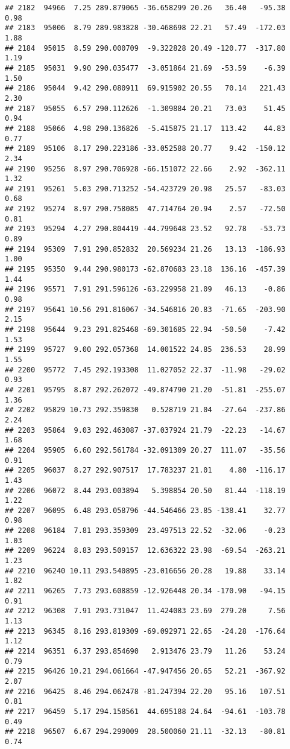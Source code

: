 \documentclass[]{article}
\begin{document}
\begin{verbatim}
## 2182  94966  7.25 289.879065 -36.658299 20.26   36.40   -95.38  0.98
## 2183  95006  8.79 289.983828 -30.468698 22.21   57.49  -172.03  1.88
## 2184  95015  8.59 290.000709  -9.322828 20.49 -120.77  -317.80  1.19
## 2185  95031  9.90 290.035477  -3.051864 21.69  -53.59    -6.39  1.50
## 2186  95044  9.42 290.080911  69.915902 20.55   70.14   221.43  2.30
## 2187  95055  6.57 290.112626  -1.309884 20.21   73.03    51.45  0.94
## 2188  95066  4.98 290.136826  -5.415875 21.17  113.42    44.83  0.77
## 2189  95106  8.17 290.223186 -33.052588 20.77    9.42  -150.12  2.34
## 2190  95256  8.97 290.706928 -66.151072 22.66    2.92  -362.11  1.32
## 2191  95261  5.03 290.713252 -54.423729 20.98   25.57   -83.03  0.68
## 2192  95274  8.97 290.758085  47.714764 20.94    2.57   -72.50  0.81
## 2193  95294  4.27 290.804419 -44.799648 23.52   92.78   -53.73  0.89
## 2194  95309  7.91 290.852832  20.569234 21.26   13.13  -186.93  1.00
## 2195  95350  9.44 290.980173 -62.870683 23.18  136.16  -457.39  1.44
## 2196  95571  7.91 291.596126 -63.229958 21.09   46.13    -0.86  0.98
## 2197  95641 10.56 291.816067 -34.546816 20.83  -71.65  -203.90  2.15
## 2198  95644  9.23 291.825468 -69.301685 22.94  -50.50    -7.42  1.53
## 2199  95727  9.00 292.057368  14.001522 24.85  236.53    28.99  1.55
## 2200  95772  7.45 292.193308  11.027052 22.37  -11.98   -29.02  0.93
## 2201  95795  8.87 292.262072 -49.874790 21.20  -51.81  -255.07  1.36
## 2202  95829 10.73 292.359830   0.528719 21.04  -27.64  -237.86  2.24
## 2203  95864  9.03 292.463087 -37.037924 21.79  -22.23   -14.67  1.68
## 2204  95905  6.60 292.561784 -32.091309 20.27  111.07   -35.56  0.91
## 2205  96037  8.27 292.907517  17.783237 21.01    4.80  -116.17  1.43
## 2206  96072  8.44 293.003894   5.398854 20.50   81.44  -118.19  1.22
## 2207  96095  6.48 293.058796 -44.546466 23.85 -138.41    32.77  0.98
## 2208  96184  7.81 293.359309  23.497513 22.52  -32.06    -0.23  1.03
## 2209  96224  8.83 293.509157  12.636322 23.98  -69.54  -263.21  1.23
## 2210  96240 10.11 293.540895 -23.016656 20.28   19.88    33.14  1.82
## 2211  96265  7.73 293.608859 -12.926448 20.34 -170.90   -94.15  0.91
## 2212  96308  7.91 293.731047  11.424083 23.69  279.20     7.56  1.13
## 2213  96345  8.16 293.819309 -69.092971 22.65  -24.28  -176.64  1.12
## 2214  96351  6.37 293.854690   2.913476 23.79   11.26    53.24  0.79
## 2215  96426 10.21 294.061664 -47.947456 20.65   52.21  -367.92  2.07
## 2216  96425  8.46 294.062478 -81.247394 22.20   95.16   107.51  0.81
## 2217  96459  5.17 294.158561  44.695188 24.64  -94.61  -103.78  0.49
## 2218  96507  6.67 294.299009  28.500060 21.11  -32.13   -80.81  0.74

\end{verbatim}
\end{document}
